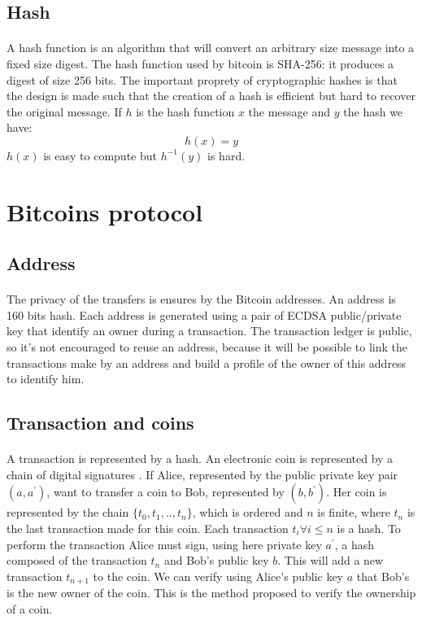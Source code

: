 \documentclass[letterpaper]{article}
\begin{document}
\subsection{Hash}

\paragraph{}
A hash function is an algorithm that will convert an arbitrary
size message into a fixed size digest. The hash function
used by bitcoin is SHA-256: it produces a digest of size 256 bits.
The important proprety of cryptographic hashes is that the design is made
such that the creation of a hash is efficient but hard to recover the
original message. If $h$ is the hash function $x$ the message and $y$ the hash
we have:
\begin{equation}
    h(x) = y
\end{equation}
$h(x)$ is easy to compute but $h^{-1}(y)$ is hard.

\section{Bitcoins protocol}

\subsection{Address}
\paragraph{}
The privacy of the transfers is ensures by the Bitcoin addresses. An address
is 160 bits hash. Each address
is generated using a pair of ECDSA public/private key that identify an owner
during a transaction. The transaction ledger is public, so it's not encouraged
to reuse an address, because it will be possible to link the transactions
make by an address and build a profile of the owner of this address to identify
him.

\subsection{Transaction and coins}
\paragraph{}
A transaction is represented by a hash.
An electronic coin is represented by a
chain of digital signatures \cite{bitcoin}.
If Alice, represented by the public private key pair $(a, a^{'})$,
want to transfer a coin to Bob, represented by $(b, b^{'})$. Her coin
is represented by the chain $\{t_0, t_1, .., t_n \}$, which is ordered
and $n$ is finite, where
$t_n$ is the last transaction made for this coin. Each transaction
$t_i \forall i \le n$ is a hash. To perform the transaction
Alice must sign, using
here private key $a^{'}$,
a hash composed of the transaction $t_n$ and Bob's public key $b$.
This will add a new
transaction $t_{n+1}$ to the coin. We can verify using Alice's public key $a$
that Bob's is the new owner of the coin.
This is the method proposed to verify the ownership of a coin.
\end{document}
